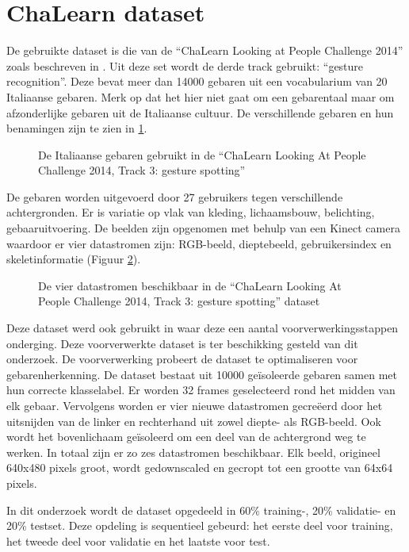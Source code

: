 \section{ChaLearn dataset}
De gebruikte dataset is die van de ``ChaLearn Looking at People Challenge 2014'' zoals beschreven in \cite{escalera_chalearn_2014}. Uit deze set wordt de derde track gebruikt: ``gesture recognition''. Deze bevat meer dan 14000 gebaren uit een vocabularium van 20 Italiaanse gebaren. Merk op dat het hier niet gaat om een gebarentaal maar om afzonderlijke gebaren uit de Italiaanse cultuur. De verschillende gebaren en hun benamingen zijn te zien in \ref{fig:gebaren}.
\begin{figure}
	\centering
	\def\svgwidth{\columnwidth}
	
	\caption{De Italiaanse gebaren gebruikt in de ``ChaLearn Looking At People Challenge 2014, Track 3: gesture spotting''}
	\label{fig:gebaren}
\end{figure}
\npar De gebaren worden uitgevoerd door 27 gebruikers tegen verschillende achtergronden. Er is variatie op vlak van kleding, lichaamsbouw, belichting, gebaaruitvoering. De beelden zijn opgenomen met behulp van een Kinect camera waardoor er vier datastromen zijn: RGB-beeld, dieptebeeld, gebruikersindex en skeletinformatie (Figuur \ref{fig:chalearn-data}).
\begin{figure}
	\centering
	\def\svgwidth{\columnwidth}
	
	\caption{De vier datastromen beschikbaar in de ``ChaLearn Looking At People Challenge 2014, Track 3: gesture spotting'' dataset}
	\label{fig:chalearn-data}
\end{figure}
\npar Deze dataset werd ook gebruikt in \cite{lionel} waar deze een aantal voorverwerkingsstappen onderging. Deze voorverwerkte dataset is ter beschikking gesteld van dit onderzoek. De voorverwerking probeert de dataset te optimaliseren voor gebarenherkenning. De dataset bestaat uit 10000 ge\"isoleerde gebaren samen met hun correcte klasselabel. Er worden 32 frames geselecteerd rond het midden van elk gebaar. Vervolgens worden er vier nieuwe datastromen gecre\"eerd door het uitsnijden van de linker en rechterhand uit zowel diepte- als RGB-beeld. Ook wordt het bovenlichaam ge\"isoleerd om een deel van de achtergrond weg te werken. In totaal zijn er zo zes datastromen beschikbaar. Elk beeld, origineel 640x480 pixels groot, wordt gedownscaled en gecropt tot een grootte van 64x64 pixels. 

\npar In dit onderzoek wordt de dataset opgedeeld in 60\% training-, 20\% validatie- en 20\% testset. Deze opdeling is sequentieel gebeurd: het eerste deel voor training, het tweede deel voor validatie en het laatste voor test.



